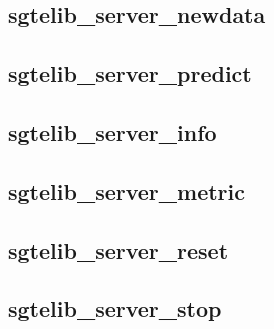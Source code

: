 \documentclass[12pt]{article}
\begin{document}
\subsection{sgtelib\_server\_newdata}

\subsection{sgtelib\_server\_predict}

\subsection{sgtelib\_server\_info}
\subsection{sgtelib\_server\_metric}
\subsection{sgtelib\_server\_reset}
\subsection{sgtelib\_server\_stop}



\clearpage

\end{document}
